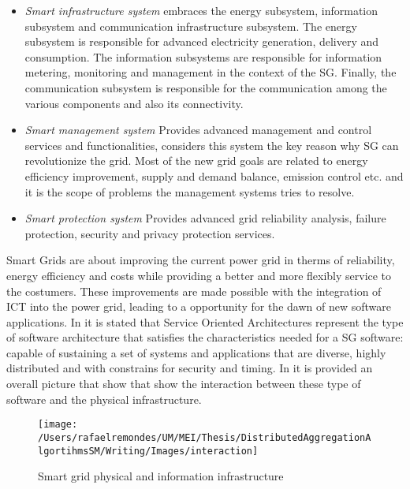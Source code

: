\begin{itemize}
\item \textit{Smart infrastructure system} embraces the energy subsystem, information subsystem and communication infrastructure subsystem. The energy subsystem is responsible for advanced electricity generation, delivery and consumption. The information subsystems are responsible for information metering, monitoring and management in the context of the SG. Finally, the communication subsystem is responsible for the communication among the various components and also its connectivity.   
\item \textit{Smart management system} Provides advanced management and control services and functionalities, \cite{journals/comsur/FangMXY12} considers this system the key reason why SG can revolutionize the grid.  Most of the new grid goals are related to energy efficiency improvement, supply and demand balance, emission control etc. and it is the scope of problems the management systems tries to resolve.
\item \textit{Smart protection system} Provides advanced grid reliability analysis, failure protection, security and privacy protection services.
 \end{itemize}
Smart Grids are about improving the current power grid in therms of reliability, energy efficiency and costs  while providing a better and more flexibly service to the costumers. These improvements are made possible with the integration of ICT into the power grid, leading to a opportunity for the dawn of new software applications. In \cite{Andrea} it is stated that Service Oriented Architectures represent the type of software architecture that satisfies the characteristics needed for a SG software: capable of sustaining a set of systems and applications that are diverse, highly distributed and with constrains for security and timing.  In  \cite{Andrea} it is provided an overall picture that show that show the interaction between these type of software and the physical infrastructure.
\begin{figure}[h]
\centering
\texttt{[image: /Users/rafaelremondes/UM/MEI/Thesis/DistributedAggregationAlgortihmsSM/Writing/Images/interaction]}
\caption{\label{fig:Interaction_model} Smart grid physical and information infrastructure}
\end{figure}

